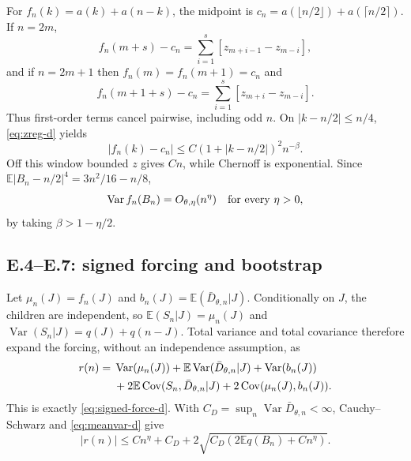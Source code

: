 \documentclass[11pt]{article}
\numberwithin{equation}{section}
\newcommand{\1}{\mathbf 1}\newcommand{\F}{\mathcal F}\newcommand{\D}{\mathcal D}
\begin{document}
For $f_n(k)=a(k)+a(n-k)$, the midpoint is
$c_n=a(\lfloor n/2\rfloor)+a(\lceil n/2\rceil)$.  If $n=2m$,
\[
f_n(m+s)-c_n=\sum_{i=1}^s[z_{m+i-1}-z_{m-i}],
\]
and if $n=2m+1$ then $f_n(m)=f_n(m+1)=c_n$ and
\[
f_n(m+1+s)-c_n=\sum_{i=1}^s[z_{m+i}-z_{m-i}].
\]
Thus first-order terms cancel pairwise, including odd $n$.  On
$|k-n/2|\le n/4$, \eqref{eq:zreg-d} yields
\begin{equation}|f_n(k)-c_n|\le C(1+|k-n/2|)^2n^{-\beta}.\label{eq:pair-d}\end{equation}
Off this window bounded $z$ gives $Cn$, while Chernoff is exponential.
Since $\mathbb E|B_n-n/2|^4=3n^2/16-n/8$,
\begin{equation}\operatorname{Var}f_n(B_n)=O_{\theta,\eta}(n^\eta)\quad
\hbox{for every }\eta>0,\label{eq:meanvar-d}\end{equation}
by taking $\beta>1-\eta/2$.

\subsection{E.4--E.7: signed forcing and bootstrap}
Let $\mu_n(J)=f_n(J)$ and $b_n(J)=\mathbb E(\bar D_{\theta,n}|J)$.
Conditionally on $J$, the children are independent, so
$\mathbb E(S_n|J)=\mu_n(J)$ and
$\operatorname{Var}(S_n|J)=q(J)+q(n-J)$.  Total variance and total covariance
therefore expand the forcing, without an independence assumption, as
\begin{align}
r(n)={}&\operatorname{Var}(\mu_n(J))
 +\mathbb E\operatorname{Var}(\bar D_{\theta,n}|J)+\operatorname{Var}(b_n(J))\notag\\
&+2\mathbb E\operatorname{Cov}(S_n,\bar D_{\theta,n}|J)
 +2\operatorname{Cov}(\mu_n(J),b_n(J)).\label{eq:five-d}
\end{align}
This is exactly \eqref{eq:signed-force-d}.  With
$C_D=\sup_n\operatorname{Var}\bar D_{\theta,n}<\infty$, Cauchy--Schwarz and
\eqref{eq:meanvar-d} give
\begin{equation}|r(n)|\le Cn^\eta+C_D+2\sqrt{C_D(2\mathbb Eq(B_n)+Cn^\eta)}.
\label{eq:rboot-d}\end{equation}
\end{document}
